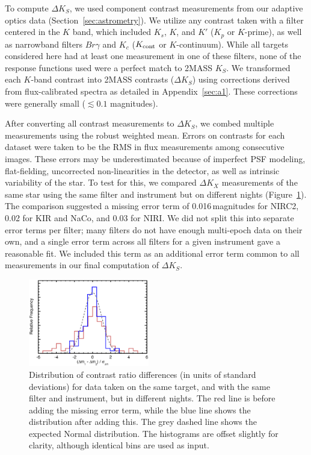 \documentclass[twocolumn]{aastex62}
\begin{document}
To compute $\Delta K_S$, we used component contrast measurements from our adaptive optics data (Section~\ref{sec:astrometry}). We utilize any contrast taken with a filter centered in the $K$ band, which included $K_s$, $K$, and $K'$ ($K_p$ or $K$-prime), as well as narrowband filters $Br\gamma$ and $K_c$ ($K_{\rm{cont}}$ or $K$-continuum). While all targets considered here had at least one measurement in one of these filters, none of the response functions used were a perfect match to 2MASS $K_S$. We transformed each $K$-band contrast into 2MASS contrasts ($\Delta K_S$) using corrections derived from flux-calibrated spectra as detailed in Appendix~\ref{sec:a1}. These corrections were generally small ($\lesssim0.1$ magnitudes).

After converting all contrast measurements to $\Delta K_S$, we combed multiple measurements using the robust weighted mean. Errors on contrasts for each dataset were taken to be the RMS in flux measurements among consecutive images. These errors may be underestimated because of imperfect PSF modeling, flat-fielding, uncorrected non-linearities in the detector, as well as intrinsic variability of the star. To test for this, we compared $\Delta K_X$ measurements of the same star using the same filter and instrument but on different nights (Figure~\ref{fig:magnitudes}). The comparison suggested a missing error term of 0.016\,magnitudes for NIRC2, 0.02 for KIR and NaCo, and 0.03 for NIRI. We did not split this into separate error terms per filter; many filters do not have enough multi-epoch data on their own, and a single error term across all filters for a given instrument gave a reasonable fit. We included this term as an additional error term common to all measurements in our final computation of $\Delta K_S$.

\begin{figure}[t]
\begin{center}
\includegraphics[width=0.47\textwidth]{errors.eps}
\caption{Distribution of contrast ratio differences (in units of standard deviations) for data taken on the same target, and with the same filter and instrument, but in different nights. The red line is before adding the missing error term, while the blue line shows the distribution after adding this. The grey dashed line shows the expected Normal distribution. The histograms are offset slightly for clarity, although identical bins are used as input.}
\label{fig:magnitudes}
\end{center}
\end{figure}
\end{document}
